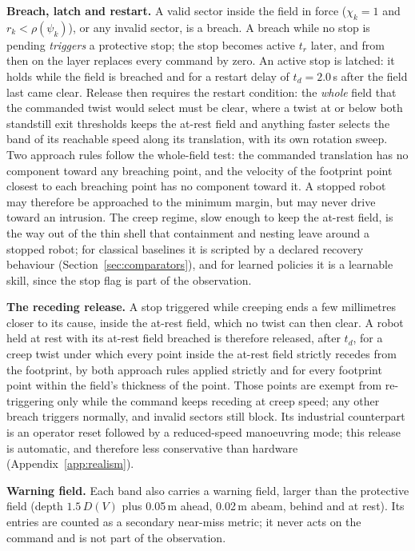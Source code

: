 \documentclass[sensors,article,submit,moreauthors]{Definitions/mdpi}
\begin{document}
\textbf{Breach, latch and restart.} A valid sector inside the field in force ($\chi_k = 1$ and $r_k < \rho(\psi_k)$), or any invalid sector, is a breach. A breach while no stop is pending \emph{triggers} a protective stop; the stop becomes active $t_r$ later, and from then on the layer replaces every command by zero. An active stop is latched: it holds while the field is breached and for a restart delay of $t_d = 2.0$\,s after the field last came clear. Release then requires the restart condition: the \emph{whole} field that the commanded twist would select must be clear, where a twist at or below both standstill exit thresholds keeps the at-rest field and anything faster selects the band of its reachable speed along its translation, with its own rotation sweep. Two approach rules follow the whole-field test: the commanded translation has no component toward any breaching point, and the velocity of the footprint point closest to each breaching point has no component toward it. A stopped robot may therefore be approached to the minimum margin, but may never drive toward an intrusion. The creep regime, slow enough to keep the at-rest field, is the way out of the thin shell that containment and nesting leave around a stopped robot; for classical baselines it is scripted by a declared recovery behaviour (Section~\ref{sec:comparators}), and for learned policies it is a learnable skill, since the stop flag is part of the observation.

\textbf{The receding release.} A stop triggered while creeping ends a few millimetres closer to its cause, inside the at-rest field, which no twist can then clear. A robot held at rest with its at-rest field breached is therefore released, after $t_d$, for a creep twist under which every point inside the at-rest field strictly recedes from the footprint, by both approach rules applied strictly and for every footprint point within the field's thickness of the point. Those points are exempt from re-triggering only while the command keeps receding at creep speed; any other breach triggers normally, and invalid sectors still block. Its industrial counterpart is an operator reset followed by a reduced-speed manoeuvring mode; this release is automatic, and therefore less conservative than hardware (Appendix~\ref{app:realism}).

\textbf{Warning field.} Each band also carries a warning field, larger than the protective field (depth $1.5\,D(V)$ plus 0.05\,m ahead, 0.02\,m abeam, behind and at rest). Its entries are counted as a secondary near-miss metric; it never acts on the command and is not part of the observation.
\end{document}
